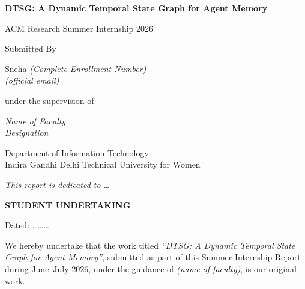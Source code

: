 \documentclass[11pt,a4paper]{article}
\newcommand{\worktitle}{DTSG: A Dynamic Temporal State Graph for Agent Memory}
\begin{document}
\begin{titlepage}
\centering
\vspace*{2cm}
{\LARGE \bfseries \worktitle\par}
\vspace{1cm}
{\Large ACM Research Summer Internship 2026\par}
\vspace{2cm}
{\large Submitted By\par}
\vspace{0.4cm}
{\large
Sneha \textit{(Complete Enrollment Number)}\\ %
\textit{(official email)}\par}                %
\vspace{1.5cm}
{\large under the supervision of\par}
\vspace{0.4cm}
{\large \textit{Name of Faculty}\\ \textit{Designation}\par} %
\vspace{1.5cm}
{\large Department of Information Technology\\
Indira Gandhi Delhi Technical University for Women\par}
\vfill
\end{titlepage}
\setcounter{page}{2}

\clearpage
\thispagestyle{plain}
\vspace*{4cm}
\begin{center}
\textit{This report is dedicated to \dots} %
\end{center}
\clearpage

\thispagestyle{plain}
\begin{center}\textbf{\large STUDENT UNDERTAKING}\end{center}
\vspace{0.5cm}
\noindent Dated: \dots\dots\dots\ %
\vspace{0.5cm}

\noindent We hereby undertake that the work titled \textit{``\worktitle''},
submitted as part of this Summer Internship Report during June--July 2026,
under the guidance of \textit{(name of faculty)}, is our original work. %
\end{document}
